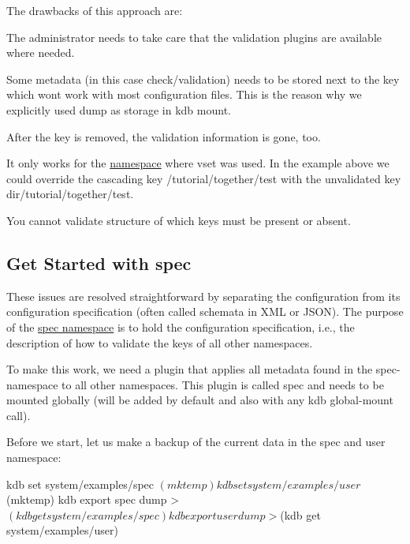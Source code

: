 The drawbacks of this approach are\+:


\begin{DoxyItemize}
\item The administrator needs to take care that the validation plugins are available where needed.
\item Some metadata (in this case {\ttfamily check/validation}) needs to be stored next to the key which won\textquotesingle{}t work with most configuration files. This is the reason why we explicitly used {\ttfamily dump} as storage in {\ttfamily kdb mount}.
\item After the key is removed, the validation information is gone, too.
\item It only works for the \hyperlink{doc_tutorials_namespaces_md}{namespace} where {\ttfamily vset} was used. In the example above we could override the cascading key {\ttfamily /tutorial/together/test} with the unvalidated key {\ttfamily dir/tutorial/together/test}.
\item You cannot validate structure of which keys must be present or absent.
\end{DoxyItemize}

\subsection*{Get Started with {\ttfamily spec}}

These issues are resolved straightforward by separating the configuration from its configuration specification (often called schemata in X\+ML or J\+S\+ON). The purpose of the \hyperlink{doc_tutorials_namespaces_md}{spec namespace} is to hold the configuration specification, i.\+e., the description of how to validate the keys of all other namespaces.

To make this work, we need a plugin that applies all metadata found in the {\ttfamily spec}-\/namespace to all other namespaces. This plugin is called {\ttfamily spec} and needs to be mounted globally (will be added by default and also with any {\ttfamily kdb global-\/mount} call).

Before we start, let us make a backup of the current data in the spec and user namespace\+:


\begin{DoxyCode}
kdb set system/examples/spec $(mktemp)
kdb set system/examples/user $(mktemp)
kdb export spec dump > $(kdb get system/examples/spec)
kdb export user dump > $(kdb get system/examples/user)
\end{DoxyCode}



